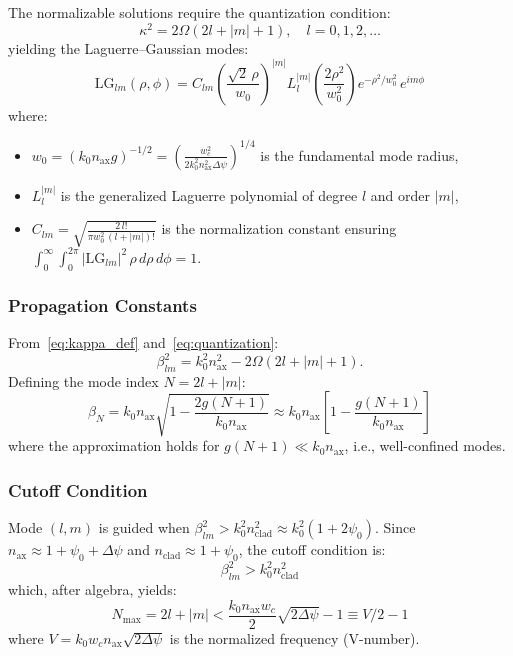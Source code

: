 \documentclass[journal,twocolumn]{IEEEtran}
\newcommand{\LG}{\mathrm{LG}}
\begin{document}
The normalizable solutions require the quantization condition:
\begin{equation}
\kappa^2 = 2\Omega(2l + |m| + 1), \quad l = 0, 1, 2, \ldots
\label{eq:quantization}
\end{equation}
yielding the Laguerre--Gaussian modes:
\begin{equation}
\boxed{
\LG_{lm}(\rho,\phi) = C_{lm}\left(\frac{\sqrt{2}\,\rho}{w_0}\right)^{\!|m|}
L_l^{|m|}\!\left(\frac{2\rho^2}{w_0^2}\right)
e^{-\rho^2/w_0^2}\,e^{im\phi}
}
\label{eq:LG_modes}
\end{equation}
where:
\begin{itemize}
\item $w_0 = (k_0 n_\text{ax} g)^{-1/2}
= \left(\frac{w_c^2}{2k_0^2 n_\text{ax}^2 \Delta\psi}\right)^{1/4}$
is the fundamental mode radius,
\item $L_l^{|m|}$ is the generalized Laguerre polynomial of degree $l$
and order $|m|$,
\item $C_{lm} = \sqrt{\frac{2\,l!}{\pi w_0^2\,(l+|m|)!}}$ is the
normalization constant ensuring $\int_0^\infty\int_0^{2\pi}
|\LG_{lm}|^2\,\rho\,d\rho\,d\phi = 1$.
\end{itemize}

\subsubsection{Propagation Constants}

From~\eqref{eq:kappa_def} and~\eqref{eq:quantization}:
\begin{equation}
\beta_{lm}^2 = k_0^2 n_\text{ax}^2 - 2\Omega(2l + |m| + 1).
\label{eq:beta_sq}
\end{equation}
Defining the mode index $N = 2l + |m|$:
\begin{equation}
\boxed{
\beta_N = k_0 n_\text{ax}\sqrt{1 - \frac{2g(N+1)}{k_0 n_\text{ax}}}
\approx k_0 n_\text{ax}\left[1 - \frac{g(N+1)}{k_0 n_\text{ax}}\right]
}
\label{eq:beta_N}
\end{equation}
where the approximation holds for $g(N+1) \ll k_0 n_\text{ax}$, i.e.,
well-confined modes.

\subsubsection{Cutoff Condition}

Mode $(l,m)$ is guided when $\beta_{lm}^2 > k_0^2 n_\text{clad}^2
\approx k_0^2(1 + 2\psi_0)$. Since $n_\text{ax} \approx 1 + \psi_0 + \Delta\psi$
and $n_\text{clad} \approx 1 + \psi_0$, the cutoff condition is:
\begin{equation}
\beta_{lm}^2 > k_0^2 n_\text{clad}^2
\end{equation}
which, after algebra, yields:
\begin{equation}
\boxed{
N_\text{max} = 2l + |m| < \frac{k_0 n_\text{ax} w_c}{2}\sqrt{2\Delta\psi} - 1
\equiv V/2 - 1
}
\label{eq:cutoff}
\end{equation}
where $V = k_0 w_c n_\text{ax}\sqrt{2\Delta\psi}$ is the normalized
frequency (V-number).
\end{document}
